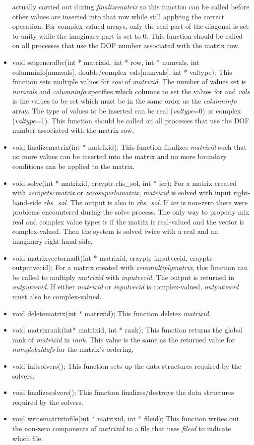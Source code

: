 \begin{itemize}
actually carried out during \textit{finalizematrix} so this function can be called before other values
are inserted into that row while still applying the correct operation.  For complex-valued arrays, 
only the real part of the diagonal is set to unity while the imaginary part is set to 0.  This function 
should be called on all processes that use the DOF number associated with the matrix row.
\item  void setgeneralbc(int * matrixid, int * row, int * numvals,
		     int  columninfo[numvals], double/complex vals[numvals], int * valtype);
This function sets multiple values for \textit{row} of \textit{matrixid}.  The number of values set is
\textit{numvals} and \textit{columninfo} specifies which columns to set the values for and 
\textit{vals} is the values to be set which must be in the same order as the \textit{columninfo} array.
 The type of values to
 be inserted can be real (\textit{valtype}=0)
or complex (\textit{valtype}=1).
This function 
should be called on all processes that use the DOF number associated with the matrix row.
\item  void finalizematrix(int * matrixid);  This function finalizes \textit{matrixid} such that no
more values can be inserted into the matrix and no more boundary conditions can be applied to the matrix.
\item  void solve(int * matrixid, crayptr rhs\_sol, int * ier);  For a matrix created with \textit{zeropetscmatrix}
or \textit{zerosuperlumatrix}, \textit{matrixid} is solved with input right-hand-side \textit{rhs\_sol}. 
The output  is also in \textit{rhs\_sol}.  If \textit{ier} is non-zero there were problems encountered during
the solve process.  The only way to properly mix real and complex value types is if the matrix is real-valued
and the vector is complex-valued.  Then the system is solved twice with a real and an imaginary right-hand-side.  
\item  void matrixvectormult(int * matrixid, crayptr inputvecid, crayptr outputvecid);  For a matrix created with \textit{zeromultiplymatrix}, this function can be called to multiply \textit{matrixid} with \textit{inputvecid}.  The output is returned in \textit{outputvecid}.  If either \textit{matrixid} or \textit{inputvecid}
is complex-valued, \textit{outputvecid} must also be complex-valued.
\item  void deletematrix(int * matrixid);  This function deletes \textit{matrixid}.
\item  void matrixrank(int* matrixid, int * rank);  This function returns the global rank of \textit{matrixid}
in \textit{rank}.  This value is the same as the returned value for \textit{numglobaldofs} for the matrix's
ordering.
\item  void initsolvers();  This function sets up the data structures required by the solvers.
\item  void finalizesolvers();  This function finalizes/destroys the data structures required by the solvers.
\item  void writematrixtofile(int * matrixid, int * fileid);  This function writes out the non-zero components
of \textit{matrixid} to a file that uses \textit{fileid} to indicate which file.
\end{itemize}
